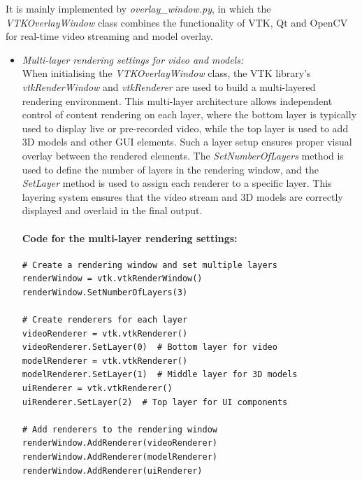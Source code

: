 \documentclass[12pt]{article}
\begin{document}
\begin{enumerate}
\begin{enumerate}
                        It is mainly implemented by \emph{overlay\_window.py}, in which the \emph{VTKOverlayWindow} class combines the functionality of VTK, Qt and OpenCV for real-time video streaming and model overlay.
                        \begin{itemize}
                              \item \textit{Multi-layer rendering settings for video and models:}
                                    \\
                                    When initialising the \emph{VTKOverlayWindow} class, the VTK library's \emph{vtkRenderWindow} and \emph{vtkRenderer} are used to build a multi-layered rendering environment\cite{7783818}. This multi-layer architecture allows independent control of content rendering on each layer, where the bottom layer is typically used to display live or pre-recorded video, while the top layer is used to add 3D models and other GUI elements\cite{5974642,6194820}. Such a layer setup ensures proper visual overlay between the rendered elements. The \emph{SetNumberOfLayers} method is used to define the number of layers in the rendering window, and the \emph{SetLayer} method is used to assign each renderer to a specific layer. This layering system ensures that the video stream and 3D models are correctly displayed and overlaid in the final output\cite{7783818}.
                                    \paragraph{Code for the multi-layer rendering settings:}
                                    \begin{verbatim}
# Create a rendering window and set multiple layers
renderWindow = vtk.vtkRenderWindow()
renderWindow.SetNumberOfLayers(3)

# Create renderers for each layer
videoRenderer = vtk.vtkRenderer()
videoRenderer.SetLayer(0)  # Bottom layer for video
modelRenderer = vtk.vtkRenderer()
modelRenderer.SetLayer(1)  # Middle layer for 3D models
uiRenderer = vtk.vtkRenderer()
uiRenderer.SetLayer(2)  # Top layer for UI components

# Add renderers to the rendering window
renderWindow.AddRenderer(videoRenderer)
renderWindow.AddRenderer(modelRenderer)
renderWindow.AddRenderer(uiRenderer)
                              \end{verbatim}


\end{itemize}
\end{enumerate}
\end{enumerate}
\end{document}
